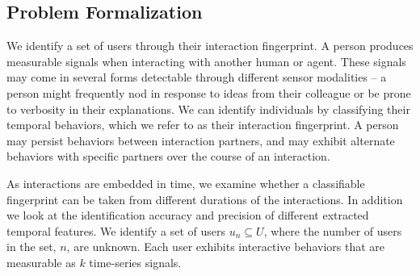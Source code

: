 \documentclass[conference]{IEEEtran}
\begin{document}

\subsection{Problem Formalization}

We identify a set of users through their interaction fingerprint. A person produces measurable signals when interacting with another human or agent. These signals may come in several forms detectable through different sensor modalities -- a person might frequently nod in response to ideas from their colleague or be prone to verbosity in their explanations. We can identify individuals by classifying their temporal behaviors, which we refer to as their interaction fingerprint. A person may persist behaviors between interaction partners, and may exhibit alternate behaviors with specific partners over the course of an interaction. 

As interactions are embedded in time, we examine whether a classifiable fingerprint can be taken from different durations of the interactions. In addition we look at the identification accuracy and precision of different extracted temporal features. We identify a set of users $u_n \subseteq U$, where the number of users in the set, $n$, are unknown. Each user exhibits interactive behaviors that are measurable as $k$ time-series signals.
\end{document}
